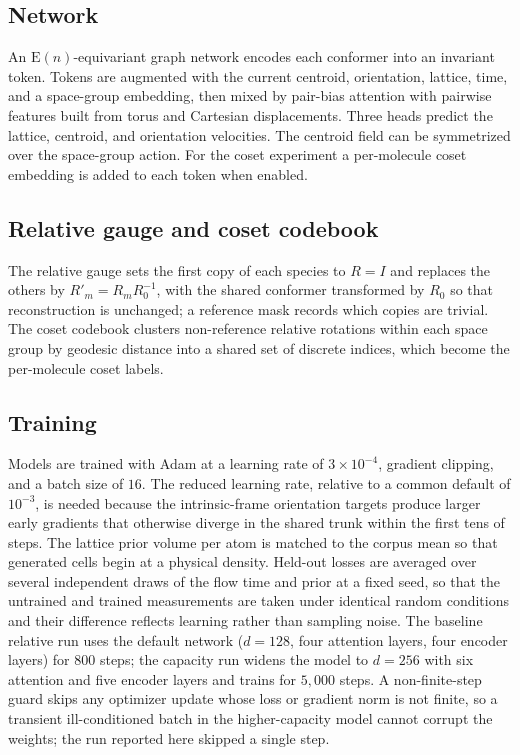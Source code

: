\documentclass[10pt]{article}
\begin{document}
\subsection{Network}
An $\mathrm{E}(n)$-equivariant graph network \citep{satorras2021egnn} encodes each
conformer into an invariant token. Tokens are augmented with the current
centroid, orientation, lattice, time, and a space-group embedding, then mixed by
pair-bias attention with pairwise features built from torus and Cartesian
displacements. Three heads predict the lattice, centroid, and orientation
velocities. The centroid field can be symmetrized over the space-group action.
For the coset experiment a per-molecule coset embedding is added to each token
when enabled.

\subsection{Relative gauge and coset codebook}
The relative gauge sets the first copy of each species to $R=I$ and replaces the
others by $R'_m = R_m R_0^{-1}$, with the shared conformer transformed by
$R_0$ so that reconstruction is unchanged; a reference mask records which copies
are trivial. The coset codebook clusters non-reference relative rotations within
each space group by geodesic distance into a shared set of discrete indices,
which become the per-molecule coset labels.

\subsection{Training}
Models are trained with Adam at a learning rate of $3\times10^{-4}$, gradient
clipping, and a batch size of $16$. The reduced learning rate, relative to a
common default of $10^{-3}$, is needed because the intrinsic-frame orientation
targets produce larger early gradients that otherwise diverge in the shared
trunk within the first tens of steps. The lattice prior volume per atom is
matched to the corpus mean so that generated cells begin at a physical density.
Held-out losses are averaged over several independent draws of the flow time and
prior at a fixed seed, so that the untrained and trained measurements are taken
under identical random conditions and their difference reflects learning rather
than sampling noise. The baseline relative run uses the default network
($d{=}128$, four attention layers, four encoder layers) for $800$ steps; the
capacity run widens the model to $d{=}256$ with six attention and five encoder
layers and trains for $5{,}000$ steps. A non-finite-step guard skips any
optimizer update whose loss or gradient norm is not finite, so a transient
ill-conditioned batch in the higher-capacity model cannot corrupt the weights;
the run reported here skipped a single step.
\end{document}
